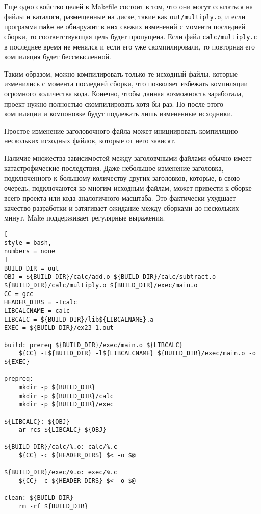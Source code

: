\documentclass[%
	11pt,
	a4paper,
	utf8,
		]{article}
\begin{document}
Еще одно свойство целей в Makefile состоит в том, что они могут ссылаться на файлы и каталоги, размещенные на диске, такие как \verb|out/multiply.o|, и если программа \verb|make| не обнаружит в них свежих изменений с момента последней сборки, то соответствующая цель будет пропущена. Если файл \verb|calc/multiply.c| в последнее время не менялся и если его уже скомпилировали, то повторная его компиляция будет бессмысленной.

Таким образом, можно компилировать только те исходный файлы, которые изменились с момента последней сборки, что позволяет избежать компиляции огромного количества кода. Конечно, чтобы данная возможность заработала, проект нужно полностью скомпилировать хотя бы раз. Но после этого компиляции и компоновке будут подлежать лишь измененные исходники.

Простое изменение заголовочного файла может инициировать компиляцию нескольких исходных файлов, которые от него зависят.

Наличие множества зависимостей между заголовчными файлами обычно имеет катастрофические последствия. Даже небольшое изменение заголовка, подключенного к большому количеству других заголовков, которые, в свою очередь, подключаются ко многим исходным файлам, может привести к сборке всего проекта или кода аналогичного масштаба. Это фактически ухудшает качество разработки и затягивает ожидание между сборками до нескольких минут. Make поддерживает регулярные выражения.
\begin{lstlisting}[
style = bash,
numbers = none
]
BUILD_DIR = out
OBJ = ${BUILD_DIR}/calc/add.o ${BUILD_DIR}/calc/subtract.o ${BUILD_DIR}/calc/multiply.o ${BUILD_DIR}/exec/main.o
CC = gcc
HEADER_DIRS = -Icalc
LIBCALCNAME = calc
LIBCALC = ${BUILD_DIR}/lib${LIBCALNAME}.a
EXEC = ${BUILD_DIR}/ex23_1.out

build: prereq ${BUILD_DIR}/exec/main.o ${LIBCALC}
    ${CC} -L${BUILD_DIR} -l${LIBCALCNAME} ${BUILD_DIR}/exec/main.o -o ${EXEC}
    
prepreq:
    mkdir -p ${BUILD_DIR}
    mkdir -p ${BUILD_DIR}/calc
    mkdir -p ${BUILD_DIR}/exec
    
${LIBCALC}: ${OBJ}
    ar rcs ${LIBCALC} ${OBJ}
    
${BUILD_DIR}/calc/%.o: calc/%.c
    ${CC} -c ${HEADER_DIRS} $< -o $@
    
${BUILD_DIR}/exec/%.o: exec/%.c
    ${CC} -c ${HEADER_DIRS} $< -o $@

clean: ${BUILD_DIR}
    rm -rf ${BUILD_DIR}
\end{lstlisting}
\end{document}
